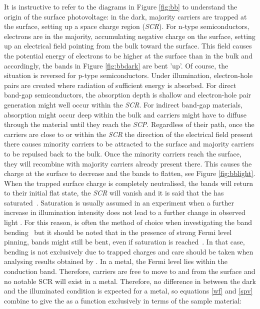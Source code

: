 It is instructive to refer to the diagrams in Figure \ref{fig:bb} to understand the origin of the surface photovoltage: in the dark, majority carriers are trapped at the surface, setting up a space charge region (\emph{SCR}). For n-type semiconductors, electrons are in the majority, accumulating negative charge on the surface, setting up an electrical field pointing from the bulk toward the surface. This field causes the potential energy of electrons to be higher at the surface than in the bulk and accordingly, the bands in Figure \ref{fig:bbdark} are bent 'up'. Of course, the situation is reversed for p-type semiconductors. Under illumination, electron-hole pairs are created where radiation of sufficient energy is absorbed. For direct band-gap semiconductors, the absorption depth is shallow and electron-hole pair generation might well occur within the \emph{SCR}. For indirect band-gap materials, absorption might occur deep within the bulk and carriers might have to diffuse through the material until they reach the \emph{SCP}. Regardless of their path, once the carriers are close to or within the \emph{SCR} the direction of the electrical field present there causes minority carriers to be attracted to the surface and majority carriers to be repulsed back to the bulk. Once the minority carriers reach the surface, they will recombine with majority carriers already present there. This causes the charge at the surface to decrease and the bands to flatten, see Figure \ref{fig:bblight}. When the trapped surface charge is completely neutralised, the bands will return to their initial flat state, the \emph{SCR} will vanish and it is said that the \spv{} has saturated~\cite{yates_bandbend}. Saturation is usually assumed in an experiment when a further increase in illumination intensity does not lead to a further change in observed light \cpd{}. For this reason, \spv{} is often the method of choice when investigating the band bending~\cite{macnamara_tempdepspv,macnamara_tempdepspv2} but it should be noted that in the presence of strong Fermi level pinning, bands might still be bent, even if \spv{} saturation is reached~\cite{kronik_spv}. In that case, bending is not exclusively due to trapped charges and care should be taken when analysing results obtained by \spv{}. In a metal, the Fermi level lies within the conduction band. Therefore, carriers are free to move to and from the surface and no notable SCR will exist in a metal. Therefore, no difference in \cpd{} between the dark and the illuminated condition is expected for a metal, so equations \eqref{wf} and \eqref{spv} combine to give the \spv{} as a function exclusively in terms of the sample material:
